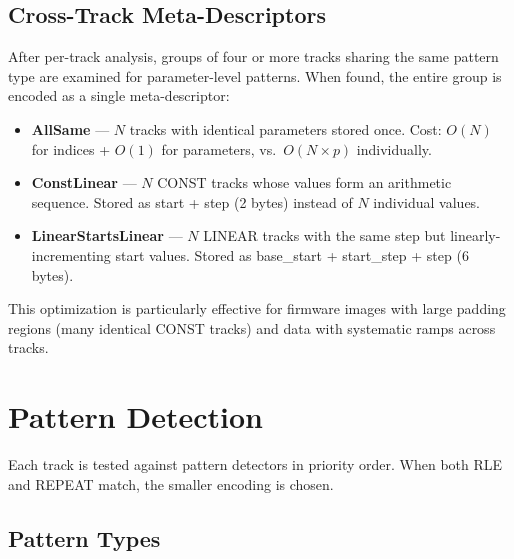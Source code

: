\documentclass[11pt,a4paper]{article}
\begin{document}
\subsection{Cross-Track Meta-Descriptors}

After per-track analysis, groups of four or more tracks sharing the same pattern type are examined for parameter-level patterns. When found, the entire group is encoded as a single meta-descriptor:

\begin{itemize}
\item \textbf{AllSame} --- $N$ tracks with identical parameters stored once. Cost: $O(N)$ for indices + $O(1)$ for parameters, vs.\ $O(N \times p)$ individually.
\item \textbf{ConstLinear} --- $N$ CONST tracks whose values form an arithmetic sequence. Stored as start + step (2 bytes) instead of $N$ individual values.
\item \textbf{LinearStartsLinear} --- $N$ LINEAR tracks with the same step but linearly-incrementing start values. Stored as base\_start + start\_step + step (6 bytes).
\end{itemize}

This optimization is particularly effective for firmware images with large padding regions (many identical CONST tracks) and data with systematic ramps across tracks.

\section{Pattern Detection}

Each track is tested against pattern detectors in priority order. When both RLE and REPEAT match, the smaller encoding is chosen.

\subsection{Pattern Types}
\end{document}
